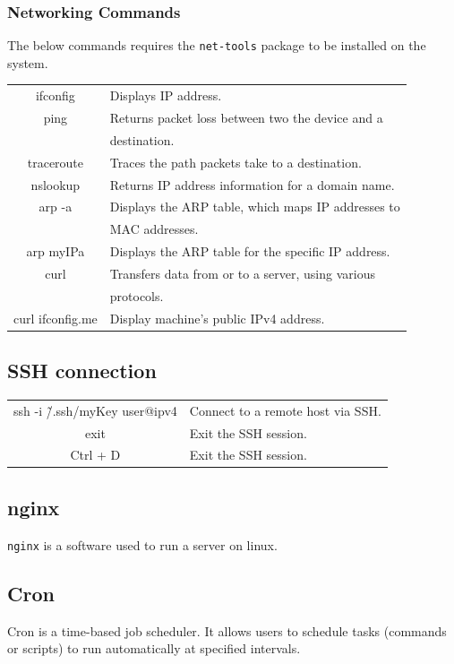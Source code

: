 \documentclass[10pt]{article}
\begin{document}
\begin{multicols}{2}
\subsubsection{Networking Commands}
The below commands requires the \texttt{net-tools} package to be installed on the system.\\
\begin{tabular}{C L}
ifconfig            & Displays IP address.\\
ping                & Returns packet loss between two the device and a\\
                    & destination.\\
traceroute          & Traces the path packets take to a destination.\\
nslookup            & Returns IP address information for a domain name.\\
arp -a              & Displays the ARP table, which maps IP addresses to\\
                    & MAC addresses.\\
arp myIPa           & Displays the ARP table for the specific IP address.\\
curl                & Transfers data from or to a server, using various\\
                    & protocols.\\
curl ifconfig.me    & Display machine's public IPv4 address.\\
\end{tabular}

\subsection{SSH connection}
\begin{tabular}{C L}
    ssh -i \~/.ssh/myKey user@ipv4   & Connect to a remote host via SSH. \\
    exit            & Exit the SSH session. \\
    Ctrl + D        & Exit the SSH session. \\
\end{tabular}

\subsection{nginx}
\texttt{nginx} is a software used to run a server on linux.\\

\subsection{Cron}
Cron is a time-based job scheduler. It allows users to schedule tasks (commands or scripts) to run automatically at specified intervals.\\

\end{multicols}
\end{document}
